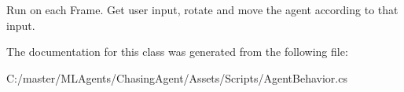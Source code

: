 Run on each Frame. Get user input, rotate and move the agent according to that input. 



The documentation for this class was generated from the following file\+:\begin{DoxyCompactItemize}
\item 
C\+:/master/\+M\+L\+Agents/\+Chasing\+Agent/\+Assets/\+Scripts/Agent\+Behavior.\+cs\end{DoxyCompactItemize}
